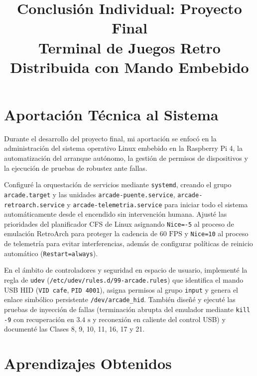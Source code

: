 \documentclass[conference]{IEEEtran}
\begin{document}
\title{Conclusión Individual: Proyecto Final \\
\large Terminal de Juegos Retro Distribuida con Mando Embebido}

\author{
}

\maketitle

\section*{Aportación Técnica al Sistema}

Durante el desarrollo del proyecto final, mi aportación se enfocó en la administración del sistema operativo Linux embebido en la Raspberry Pi 4, la automatización del arranque autónomo, la gestión de permisos de dispositivos y la ejecución de pruebas de robustez ante fallas.

Configuré la orquestación de servicios mediante \texttt{systemd}, creando el grupo \texttt{arcade.target} y las unidades \texttt{arcade-puente.service}, \texttt{arcade-retroarch.service} y \texttt{arcade-telemetria.service} para iniciar todo el sistema automáticamente desde el encendido sin intervención humana. Ajusté las prioridades del planificador CFS de Linux asignando \texttt{Nice=-5} al proceso de emulación RetroArch para proteger la cadencia de $60\text{ FPS}$ y \texttt{Nice=10} al proceso de telemetría para evitar interferencias, además de configurar políticas de reinicio automático (\texttt{Restart=always}).

En el ámbito de controladores y seguridad en espacio de usuario, implementé la regla de \texttt{udev} (\texttt{/etc/udev/rules.d/99-arcade.rules}) que identifica el mando USB HID (\texttt{VID cafe}, \texttt{PID 4001}), asigna permisos al grupo \texttt{input} y genera el enlace simbólico persistente \texttt{/dev/arcade\_hid}. También diseñé y ejecuté las pruebas de inyección de fallas (terminación abrupta del emulador mediante \texttt{kill -9} con recuperación en $3.4\text{ s}$ y reconexión en caliente del control USB) y documenté las Clases 8, 9, 10, 11, 16, 17 y 21.

\section*{Aprendizajes Obtenidos}
\end{document}
